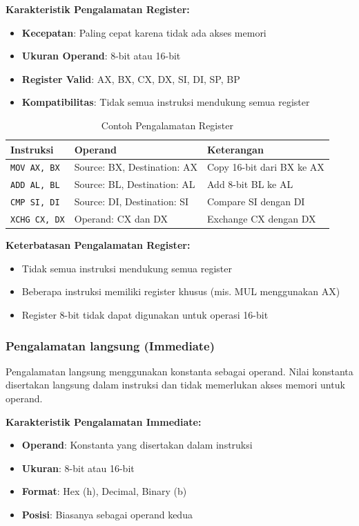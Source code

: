 \textbf{Karakteristik Pengalamatan Register:}
\begin{itemize}
    \item \textbf{Kecepatan}: Paling cepat karena tidak ada akses memori
    \item \textbf{Ukuran Operand}: 8-bit atau 16-bit
    \item \textbf{Register Valid}: AX, BX, CX, DX, SI, DI, SP, BP
    \item \textbf{Kompatibilitas}: Tidak semua instruksi mendukung semua register
\end{itemize}

\begin{table}[h]
\centering
\caption{Contoh Pengalamatan Register}
\begin{tabular}{|p{4cm}|p{4cm}|p{7cm}|}
\hline
\textbf{Instruksi} & \textbf{Operand} & \textbf{Keterangan} \\
\hline
\texttt{MOV AX, BX} & Source: BX, Destination: AX & Copy 16-bit dari BX ke AX \\
\hline
\texttt{ADD AL, BL} & Source: BL, Destination: AL & Add 8-bit BL ke AL \\
\hline
\texttt{CMP SI, DI} & Source: DI, Destination: SI & Compare SI dengan DI \\
\hline
\texttt{XCHG CX, DX} & Operand: CX dan DX & Exchange CX dengan DX \\
\hline
\end{tabular}
\label{tab:register-addressing-examples}
\end{table}

\textbf{Keterbatasan Pengalamatan Register:}
\begin{itemize}
    \item Tidak semua instruksi mendukung semua register
    \item Beberapa instruksi memiliki register khusus (mis. MUL menggunakan AX)
    \item Register 8-bit tidak dapat digunakan untuk operasi 16-bit
\end{itemize}

\subsubsection{Pengalamatan langsung (Immediate)}
Pengalamatan langsung menggunakan konstanta sebagai operand. Nilai konstanta disertakan langsung dalam instruksi dan tidak memerlukan akses memori untuk operand.

\textbf{Karakteristik Pengalamatan Immediate:}
\begin{itemize}
    \item \textbf{Operand}: Konstanta yang disertakan dalam instruksi
    \item \textbf{Ukuran}: 8-bit atau 16-bit
    \item \textbf{Format}: Hex (h), Decimal, Binary (b)
    \item \textbf{Posisi}: Biasanya sebagai operand kedua
\end{itemize}

